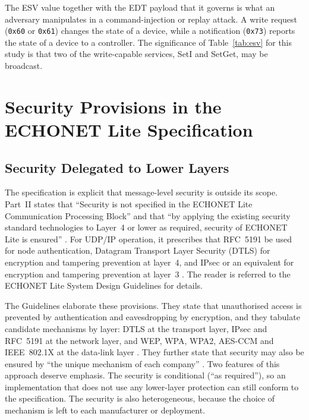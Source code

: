 The ESV value together with the EDT payload that it governs is what an adversary manipulates in a command-injection or replay attack. A write request (\texttt{0x60} or \texttt{0x61}) changes the state of a device, while a notification (\texttt{0x73}) reports the state of a device to a controller. The significance of Table~\ref{tab:esv} for this study is that two of the write-capable services, SetI and SetGet, may be broadcast.

\section{Security Provisions in the ECHONET Lite Specification}
\label{sec:echonet-security-provision}

\subsection{Security Delegated to Lower Layers}

The specification is explicit that message-level security is outside its scope. Part~II states that ``Security is not specified in the ECHONET Lite Communication Processing Block'' and that ``by applying the existing security standard technologies to Layer~4 or lower as required, security of ECHONET Lite is ensured'' \cite{ECHONETPart2}. For UDP/IP operation, it prescribes that RFC~5191 be used for node authentication, Datagram Transport Layer Security (DTLS) for encryption and tampering prevention at layer~4, and IPsec or an equivalent for encryption and tampering prevention at layer~3 \cite{ECHONETPart2}. The reader is referred to the ECHONET Lite System Design Guidelines for details.

The Guidelines elaborate these provisions. They state that unauthorised access is prevented by authentication and eavesdropping by encryption, and they tabulate candidate mechanisms by layer: DTLS at the transport layer, IPsec and RFC~5191 at the network layer, and WEP, WPA, WPA2, AES-CCM and IEEE~802.1X at the data-link layer \cite{ECHONETGuidelines}. They further state that security may also be ensured by ``the unique mechanism of each company'' \cite{ECHONETGuidelines}. Two features of this approach deserve emphasis. The security is conditional (``as required''), so an implementation that does not use any lower-layer protection can still conform to the specification. The security is also heterogeneous, because the choice of mechanism is left to each manufacturer or deployment.

